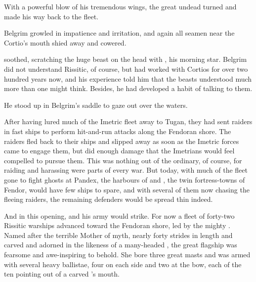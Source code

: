
With a powerful blow of his tremendous wings, the great undead \dragon{} turned and made his way back to the fleet. 



 Belgrim growled in impatience and irritation, and again all seamen near the Cortio's mouth shied away and cowered. 

 \Narkiza{} soothed, scratching the huge beast on the head with \Femtu, his morning star.  Belgrim did not understand Rissitic, of course, but \Narkiza{} had worked with Cortios for over two hundred years now, and his experience told him that the beasts understood much more than one might think. Besides, he had developed a habit of talking to them. 

He stood up in Belgrim's saddle to gaze out over the waters.  

After having lured much of the Imetric fleet away to Tugan, they had sent raiders in fast ships to perform hit-and-run attacks along the Fendoran shore. The raiders fled back to their ships and slipped away as soon as the Imetric forces came to engage them, but did enough damage that the Imetrians would feel compelled to pursue them. This was nothing out of the ordinary, of course, for raiding and harassing were parts of every war. But today, with much of the fleet gone to fight ghosts at Pandex, the harbours of \Cicora{} and \Fendacor{}, the twin fortress-towns of Fendor, would have few ships to spare, and with several of them now chasing the fleeing raiders, the remaining defenders would be spread thin indeed. 

And in this opening, \Narkiza{} and his army would strike. For now a fleet of forty-two Rissitic warships advanced toward the Fendoran shore, led by the mighty \MotherTiamat{}. Named after the terrible \Dragon{} Mother of myth, nearly forty strides in length and carved and adorned in the likeness of a many-headed \dragon, the great flagship was fearsome and awe-inspiring to behold. She bore three great masts and was armed with several heavy ballistae, four on each side and two at the bow, each of the ten pointing out of a carved \dragon's mouth. 

